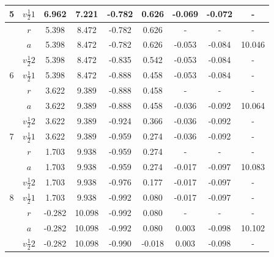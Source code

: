 \begin{table}[H]
\begin{tabular}{|c|c|c|c|c|c|c|c|c|}
5 & $v\frac{1}{2}1$  &	 6.962 &	7.221 &	-0.782 &	0.626 &	-0.069 & -0.072	& -      \\ \hline
  & $r$	             &   5.398 &	8.472	& -0.782 &	0.626	&	-	     & -      & -      \\ \hline
  & $a$	             &   5.398 &	8.472	& -0.782 & 	0.626	& -0.053 & -0.084 &	10.046 \\ \hline
  & $v\frac{1}{2}2$  &	 5.398 &	8.472	& -0.835 &	0.542	& -0.053 & -0.084	& -      \\ \hline
6 & $v\frac{1}{2}1$	 &   5.398 &	8.472	& -0.888 &	0.458	& -0.053 & -0.084	& -      \\ \hline
  & $r$	             &   3.622 &	9.389	& -0.888 &	0.458	&	-	     & -      & -      \\ \hline
  & $a$	             &   3.622 &	9.389	& -0.888 &	0.458	& -0.036 & -0.092	& 10.064 \\ \hline
  & $v\frac{1}{2}2$  &	 3.622 & 	9.389	& -0.924 &	0.366	& -0.036 & -0.092	& -      \\ \hline
7 & $v\frac{1}{2}1$  &	 3.622 &	9.389	& -0.959 &	0.274	& -0.036 & -0.092	& -      \\ \hline
  & $r$	             &   1.703 &	9.938	& -0.959 &	0.274	& -		   & -      & -      \\ \hline
  & $a$	             &   1.703 &	9.938	& -0.959 &	0.274	& -0.017 & -0.097 &	10.083 \\ \hline
  & $v\frac{1}{2}2$  &	 1.703 &	9.938	& -0.976 &	0.177	& -0.017 & -0.097	& -      \\ \hline
8 & $v\frac{1}{2}1$  &	 1.703 &	9.938	& -0.992 &	0.080	& -0.017 & -0.097	& -      \\ \hline
  & $r$	             &  -0.282 & 10.098	& -0.992 &	0.080	&	-	     & -      & -      \\ \hline
  &	$a$              &  -0.282 & 10.098	& -0.992 &	0.080	&  0.003 & -0.098 &	10.102 \\ \hline
  & $v\frac{1}{2}2$  &	-0.282 & 10.098	& -0.990 & -0.018	&  0.003 & -0.098	& -      \\ \hline
\end{tabular}
\vspace{-40pt}
\end{table}

\pagebreak

